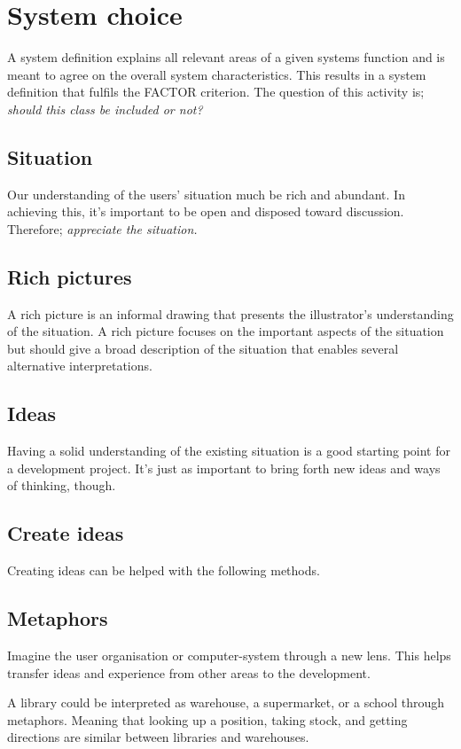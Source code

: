 \section{System choice}
A system definition explains all relevant areas of a given systems function and is meant to agree on the overall system characteristics. This results in a system definition that fulfils the FACTOR criterion.
The question of this activity is; \textit{should this class be included or not?}

\subsection{Situation}
Our understanding of the users' situation much be rich and abundant. In achieving this, it's important to be open and disposed toward discussion. Therefore; \textit{appreciate the situation.}

\subsection{Rich pictures}
A rich picture is an informal drawing that presents the illustrator's understanding of the situation. A rich picture focuses on the important aspects of the situation but should give a broad description of the situation that enables several alternative interpretations.

\subsection{Ideas}
Having a solid understanding of the existing situation is a good starting point for a development project. It's just as important to bring forth new ideas and ways of thinking, though.

\subsection{Create ideas}
Creating ideas can be helped with the following methods.

\subsection{Metaphors}
Imagine the user organisation or computer-system through a new lens. This helps transfer ideas and experience from other areas to the development. 

A library could be interpreted as warehouse, a supermarket, or a school through metaphors. Meaning that looking up a position, taking stock, and getting directions are similar between libraries and warehouses.

